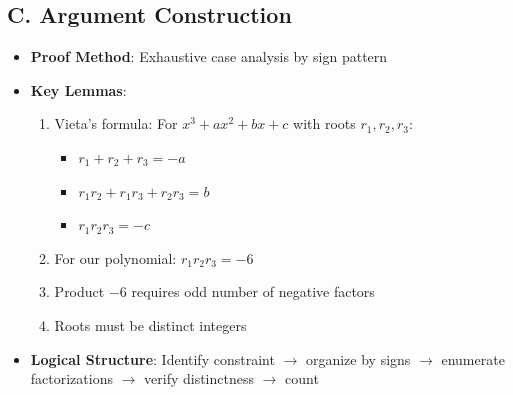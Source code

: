\documentclass[12pt]{article}
\begin{document}
\begin{strategicbox}
\subsection*{C. Argument Construction}
\begin{itemize}[leftmargin=*]
    \item \textbf{Proof Method}: Exhaustive case analysis by sign pattern
    \item \textbf{Key Lemmas}: 
    \begin{enumerate}
        \item Vieta's formula: For $x^3+ax^2+bx+c$ with roots $r_1, r_2, r_3$:
        \begin{itemize}
            \item $r_1 + r_2 + r_3 = -a$
            \item $r_1 r_2 + r_1 r_3 + r_2 r_3 = b$
            \item $r_1 r_2 r_3 = -c$
        \end{itemize}
        \item For our polynomial: $r_1 r_2 r_3 = -6$
        \item Product $-6$ requires odd number of negative factors
        \item Roots must be distinct integers
    \end{enumerate}
    \item \textbf{Logical Structure}: Identify constraint $\to$ organize by signs $\to$ enumerate factorizations $\to$ verify distinctness $\to$ count
\end{itemize}
\end{strategicbox}
\end{document}
